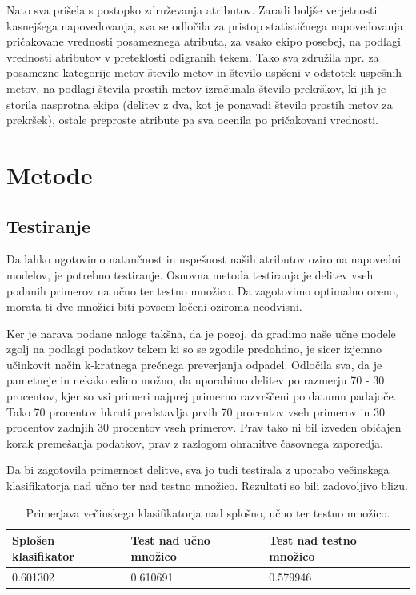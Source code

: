 \documentclass[a4paper,11pt]{article}
\begin{document}
Nato sva prišela s postopko združevanja atributov. Zaradi boljše verjetnosti 
kasnejšega napovedovanja, sva se odločila za pristop statističnega napovedovanja 
pričakovane vrednosti posameznega atributa, za vsako ekipo posebej, na podlagi 
vrednosti atributov v preteklosti odigranih tekem. Tako sva združila npr. za posamezne 
kategorije metov število metov in število uspšeni v odstotek uspešnih metov, na podlagi 
števila prostih metov izračunala število prekrškov, ki jih je storila nasprotna ekipa
 (delitev z dva, kot je ponavadi število prostih metov za prekršek), ostale preproste atribute 
pa sva ocenila po pričakovani vrednosti.

\section{Metode}

\subsection{Testiranje}

Da lahko ugotovimo natančnost in uspešnost naših atributov oziroma 
napovedni modelov, je potrebno testiranje. Osnovna metoda testiranja 
je delitev vseh podanih primerov na učno ter testno množico. Da 
zagotovimo optimalno oceno, morata ti dve množici biti povsem ločeni 
oziroma neodvisni. 

Ker je narava podane naloge takšna, da je pogoj, da gradimo naše učne 
modele zgolj na podlagi podatkov tekem ki so se zgodile predohdno, je 
sicer izjemno učinkovit način k-kratnega prečnega preverjanja odpadel. 
Odločila sva, da je pametneje in nekako edino možno, da uporabimo delitev 
po razmerju 70 - 30 procentov, kjer so vsi primeri najprej primerno razvrščeni
 po datumu padajoče. Tako 70 procentov hkrati predstavlja prvih 70 procentov 
vseh primerov in 30 procentov zadnjih 30 procentov vseh primerov. Prav tako 
ni bil izveden običajen korak premešanja podatkov, prav z razlogom ohranitve 
časovnega zaporedja.

Da bi zagotovila primernost delitve, sva jo tudi testirala z uporabo večinskega 
klasifikatorja nad učno ter nad testno množico. Rezultati so bili zadovoljivo blizu.

\begin{table}[H]
\caption{Primerjava večinskega klasifikatorja nad splošno, učno ter testno množico.}
\label{tab1}
\begin{center}
\begin{tabular}{llp{3cm}}
\hline
Splošen klasifikator & Test nad učno množico & Test nad testno množico \\
\hline
0.601302 & 0.610691 & 0.579946 \\
\hline
\end{tabular}
\end{center}
\end{table}
\end{document}
